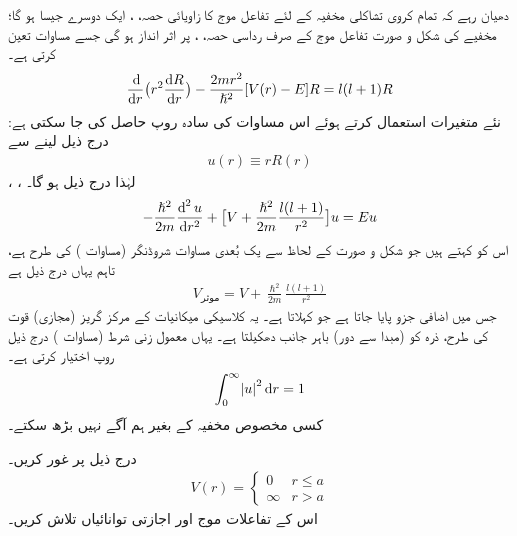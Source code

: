 دھیان رہے کہ تمام کروی تشاکلی  مخفیہ کے لئے تفاعل موج کا زاویائی حصہ، ،  ایک  دوسرے جیسا ہو گا؛ مخفیے    کی شکل و صورت تفاعل موج کے صرف رداسی حصہ، ، پر اثر انداز ہو گی جسے مساوات  تعین کرتی ہے۔
\begin{align}
\frac{\dif}{\dif r}\big(r^{2}\frac{\dif R}{\dif r}\big)-\frac{2mr^{2}}{\hslash^{2}}[V(r)-E]R=l(l+1)R
\end{align}
نئے متغیرات استعمال کرتے ہوئے اس مساوات کی سادہ روپ حاصل کی جا سکتی ہے: درج ذیل لینے سے
\begin{align}\label{مساوات_ابعادی_نئے_متغیر_رداسی}
u(r)\equiv{rR(r)} 
\end{align}  
، ،   لہٰذا درج ذیل ہو گا۔
\begin{align}\label{مساوات_ابعادی_رداسی}
-\frac{\hslash^{2}}{2m}\frac{\dif^{\,2}u}{\dif r^{2}}+\big[V+\frac{\hslash^{2}}{2m}\frac{l(l+1)}{r^{2}}\big]u=Eu
\end{align}
اس کو  کہتے ہیں جو شکل و صورت کے لحاظ سے یک بُعدی مساوات شروڈنگر (مساوات ) کی طرح ہے، تاہم یہاں  درج ذیل ہے
\begin{align}
V_{\text{موثر}}=V+\frac{\hslash^{2}}{2m}\frac{l(l+1)}{r^{2}} 
\end{align}
 جس میں   اضافی جزو پایا جاتا ہے جو  کہلاتا ہے۔ یہ کلاسیکی میکانیات کے مرکز گریز (مجازی) قوت کی طرح، ذرہ کو (مبدا سے دور) باہر جانب دھکیلتا ہے۔ یہاں معمول زنی شرط (مساوات ) درج ذیل روپ اختیار کرتی ہے۔ 
\begin{align}
\int_{0}^{\infty}\abs{u}^{2}\dif r=1 
\end{align}
کسی مخصوص مخفیہ    کے بغیر ہم آگے نہیں بڑھ سکتے۔

درج ذیل     پر غور کریں۔
\begin{align}
V(r)=\begin{cases}
0&r\le {a}\\
\infty&r>a
\end{cases} 
\end{align}
اس کے تفاعلات موج اور اجازتی توانائیاں تلاش کریں۔

